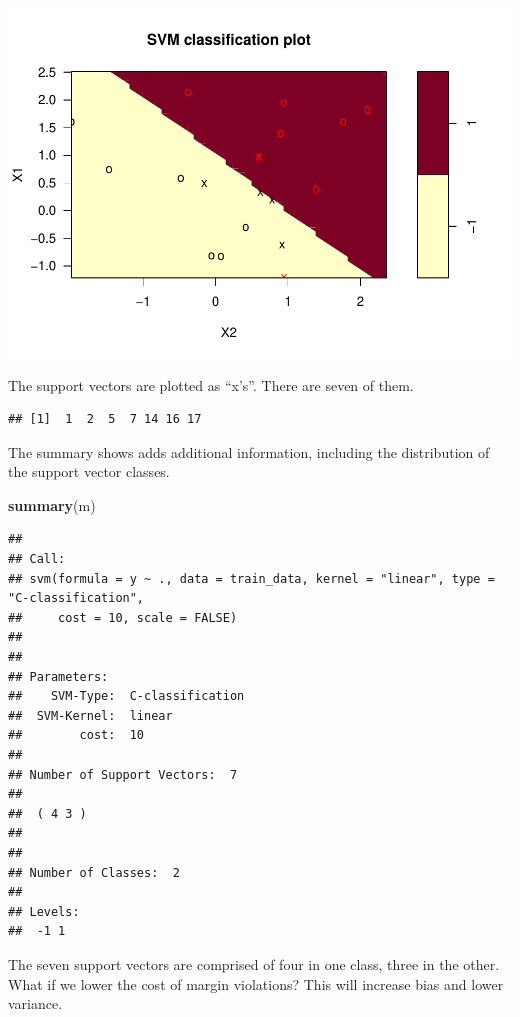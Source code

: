 \documentclass[
]{book}
\newenvironment{Shaded}{\begin{snugshade}}{\end{snugshade}}
\newcommand{\KeywordTok}[1]{\textcolor[rgb]{0.13,0.29,0.53}{\textbf{#1}}}
\newcommand{\NormalTok}[1]{#1}
\newcommand{\OperatorTok}[1]{\textcolor[rgb]{0.81,0.36,0.00}{\textbf{#1}}}
\begin{document}
\includegraphics{data-sci_files/figure-latex/unnamed-chunk-98-1.pdf}

The support vectors are plotted as ``x's''. There are seven of them.

\begin{Shaded}
\end{Shaded}

\begin{verbatim}
## [1]  1  2  5  7 14 16 17
\end{verbatim}

The summary shows adds additional information, including the distribution of the support vector classes.

\begin{Shaded}
\begin{Highlighting}[]
\KeywordTok{summary}\NormalTok{(m)}
\end{Highlighting}
\end{Shaded}

\begin{verbatim}
## 
## Call:
## svm(formula = y ~ ., data = train_data, kernel = "linear", type = "C-classification", 
##     cost = 10, scale = FALSE)
## 
## 
## Parameters:
##    SVM-Type:  C-classification 
##  SVM-Kernel:  linear 
##        cost:  10 
## 
## Number of Support Vectors:  7
## 
##  ( 4 3 )
## 
## 
## Number of Classes:  2 
## 
## Levels: 
##  -1 1
\end{verbatim}

The seven support vectors are comprised of four in one class, three in the other. What if we lower the cost of margin violations? This will increase bias and lower variance.
\end{document}

